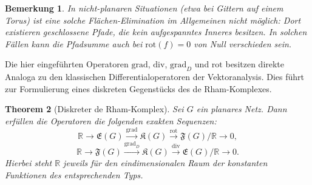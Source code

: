 \documentclass[11pt,a4paper,leqno]{report}
\newtheorem{theorem}{Theorem}[chapter]
\newtheorem{remark}[theorem]{Bemerkung}
\numberwithin{equation}{chapter}
\begin{document}
\noindent
\begin{remark}
	In nicht-planaren Situationen (etwa bei Gittern auf einem Torus) ist eine solche 
	Flächen-Elimination im Allgemeinen nicht möglich: Dort existieren geschlossene 
	Pfade, die kein aufgespanntes 
	Inneres besitzen. In solchen Fällen kann die Pfadsumme auch bei 
	$\mathrm{rot}(f)=0$ von Null verschieden sein.
\end{remark}
\noindent
Die hier eingeführten Operatoren $\mathrm{grad}$, $\mathrm{div}$, 
$\mathrm{grad}_D$ und $\mathrm{rot}$ besitzen direkte Analoga zu den klassischen Differentialoperatoren der Vektoranalysis. 
Dies führt zur Formulierung eines diskreten Gegenstücks des de Rham-Komplexes.
\begin{theorem}[Diskreter de Rham-Komplex]\label{thm:derham}
	Sei $G$ ein planares Netz. 
	Dann erfüllen die Operatoren die folgenden exakten Sequenzen:
	\begin{equation} \label{eq:derham1}
		\mathbb{R}\longrightarrow \mathfrak{E}(G) 
		\overset{\mathrm{grad}}{\longrightarrow} \mathfrak{K}(G) 
		\overset{\mathrm{rot}}{\longrightarrow} \mathfrak{F}(G)/\mathbb{R} 
		\longrightarrow 0,
	\end{equation}
	\begin{equation} \label{eq:derham2}
		\mathbb{R}\longrightarrow \mathfrak{F}(G) 
		\overset{\mathrm{grad}_D}{\longrightarrow} \mathfrak{K}(G) 
		\overset{\mathrm{div}}{\longrightarrow} \mathfrak{E}(G)/\mathbb{R} 
		\longrightarrow 0.
	\end{equation}
	Hierbei steht $\mathbb{R}$ jeweils für den eindimensionalen Raum der konstanten Funktionen des entsprechenden Typs.
\end{theorem}
\end{document}

